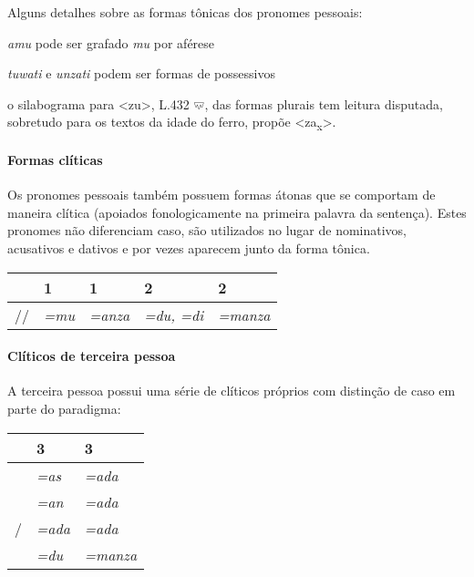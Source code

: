 \noindent Alguns detalhes sobre as formas tônicas dos pronomes pessoais:
\begin{compactitem}
	\item \emph{amu} pode ser grafado \emph{mu} por aférese
	\item \emph{tuwati} e \emph{unzati} podem ser formas de possessivos
	\item o silabograma para <zu>, L.432 𔗥, das formas plurais tem leitura disputada,
	sobretudo para os textos da idade do ferro, \citet[65--68]{Yakubovich2010}
	propõe <za\textsubscript{x}>.
\end{compactitem}

\paragraph{Formas clíticas}
Os pronomes pessoais também possuem formas átonas que se
comportam de maneira clítica (apoiados fonologicamente na primeira palavra da
sentença).
Estes pronomes não diferenciam caso, são utilizados no lugar de nominativos,
acusativos e dativos e por vezes aparecem junto da forma tônica.

\begin{center}
	\begin{tabular}[c]{lll|ll}
		\toprule
		                           & 1\Sg{}\emph{} & 1\Pl{}\emph{} & 2\Sg{}\emph{}   & 2\Pl{}\emph{} \\
		\midrule
		\Nom\slash\Acu\slash\Dat{} & \emph{=mu}    & \emph{=anza}  & \emph{=du, =di} & \emph{=manza} \\
		\bottomrule
	\end{tabular}
\end{center}


\paragraph{Clíticos de terceira pessoa}
A terceira pessoa possui uma série de clíticos próprios com distinção de caso em
parte do paradigma:

\begin{center}
	\begin{tabular}[c]{lll}
		\toprule
		                      & 3\Sg{}\emph{} & 3\Pl{}\emph{} \\
		\midrule
		\Nom{}\Com{}          & \emph{=as}    & \emph{=ada}   \\
		\Acu{}\Com{}          & \emph{=an}    & \emph{=ada}   \\
		\Nom\slash\Acu\Neut{} & \emph{=ada}   & \emph{=ada}   \\
		\Dat{}                & \emph{=du}    & \emph{=manza} \\
		\bottomrule
	\end{tabular}
\end{center}

